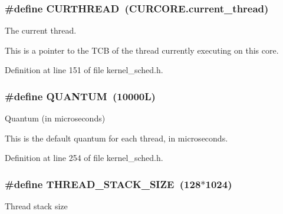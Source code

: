 \subsubsection[{\texorpdfstring{C\+U\+R\+T\+H\+R\+E\+AD}{CURTHREAD}}]{\setlength{\rightskip}{0pt plus 5cm}\#define C\+U\+R\+T\+H\+R\+E\+AD~(C\+U\+R\+C\+O\+R\+E.\+current\+\_\+thread)}\hypertarget{group__scheduler_ga587a82c8931f0df72f43cc913ceb7e27}{}\label{group__scheduler_ga587a82c8931f0df72f43cc913ceb7e27}


The current thread. 

This is a pointer to the T\+CB of the thread currently executing on this core. 

Definition at line 151 of file kernel\+\_\+sched.\+h.

\subsubsection[{\texorpdfstring{Q\+U\+A\+N\+T\+UM}{QUANTUM}}]{\setlength{\rightskip}{0pt plus 5cm}\#define Q\+U\+A\+N\+T\+UM~(10000\+L)}\hypertarget{group__scheduler_gabc4f0f9abea1b5443308e4ea84b52b21}{}\label{group__scheduler_gabc4f0f9abea1b5443308e4ea84b52b21}


Quantum (in microseconds) 

This is the default quantum for each thread, in microseconds. 

Definition at line 254 of file kernel\+\_\+sched.\+h.

\subsubsection[{\texorpdfstring{T\+H\+R\+E\+A\+D\+\_\+\+S\+T\+A\+C\+K\+\_\+\+S\+I\+ZE}{THREAD_STACK_SIZE}}]{\setlength{\rightskip}{0pt plus 5cm}\#define T\+H\+R\+E\+A\+D\+\_\+\+S\+T\+A\+C\+K\+\_\+\+S\+I\+ZE~(128$\ast$1024)}\hypertarget{group__scheduler_ga90b7a8cb7bc3fdbd98014a3e15ee6e9a}{}\label{group__scheduler_ga90b7a8cb7bc3fdbd98014a3e15ee6e9a}
Thread stack size 


